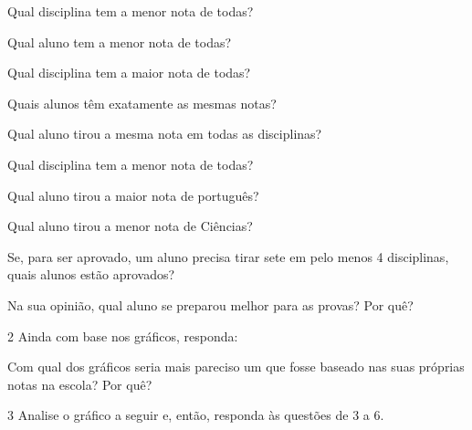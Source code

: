\pagebreak
\begin{escolha}
\item Qual disciplina tem a menor nota de todas?

\item Qual aluno tem a menor nota de todas?

\item Qual disciplina tem a maior nota de todas?

\item Quais alunos têm exatamente as mesmas notas?

\item Qual aluno tirou a mesma nota em todas as disciplinas?

\item Qual disciplina tem a menor nota de todas?

\item Qual aluno tirou a maior nota de português?

\item Qual aluno tirou a menor nota de Ciências?

\item Se, para ser aprovado, um aluno precisa tirar sete em pelo menos 4 disciplinas, quais alunos estão aprovados?

\item Na sua opinião, qual aluno se preparou melhor para as provas? Por quê?
\reduline{\mbox{}\hfill}
\reduline{\mbox{}\hfill}
\reduline{\mbox{}\hfill}
\end{escolha}

\num{2} Ainda com base nos gráficos, responda:

Com qual dos gráficos seria mais pareciso um que fosse baseado nas suas próprias notas na escola? Por quê?


\num{3} Analise o gráfico a seguir e, então, responda às questões de 3 a 6.


